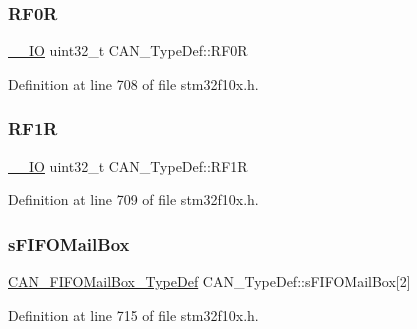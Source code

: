 \mbox{\label{struct_c_a_n___type_def_ad8e858479e26ab075ee2ddb630e8769d}} 
\subsubsection{\texorpdfstring{R\+F0R}{RF0R}}
{\footnotesize\ttfamily \hyperlink{core__sc300_8h_aec43007d9998a0a0e01faede4133d6be}{\+\_\+\+\_\+\+IO} uint32\+\_\+t C\+A\+N\+\_\+\+Type\+Def\+::\+R\+F0R}



Definition at line 708 of file stm32f10x.\+h.

\mbox{\label{struct_c_a_n___type_def_a69a528d1288c1de666df68655af1d20e}} 
\subsubsection{\texorpdfstring{R\+F1R}{RF1R}}
{\footnotesize\ttfamily \hyperlink{core__sc300_8h_aec43007d9998a0a0e01faede4133d6be}{\+\_\+\+\_\+\+IO} uint32\+\_\+t C\+A\+N\+\_\+\+Type\+Def\+::\+R\+F1R}



Definition at line 709 of file stm32f10x.\+h.

\mbox{\label{struct_c_a_n___type_def_aa6053bc607535d9ecf7a3d887c0cc053}} 
\subsubsection{\texorpdfstring{s\+F\+I\+F\+O\+Mail\+Box}{sFIFOMailBox}}
{\footnotesize\ttfamily \hyperlink{struct_c_a_n___f_i_f_o_mail_box___type_def}{C\+A\+N\+\_\+\+F\+I\+F\+O\+Mail\+Box\+\_\+\+Type\+Def} C\+A\+N\+\_\+\+Type\+Def\+::s\+F\+I\+F\+O\+Mail\+Box\mbox{[}2\mbox{]}}



Definition at line 715 of file stm32f10x.\+h.

